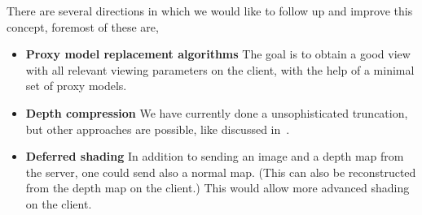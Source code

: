 There are several directions in which we would like to follow up and improve
this concept, foremost of these are,
\begin{itemize}

\item \textbf{Proxy model replacement algorithms} The goal is to obtain a good view with
all relevant viewing parameters on the client, with the help of a minimal set of
proxy models.



\item \textbf{Depth compression} We have currently done a unsophisticated
truncation, but other approaches are possible,
like discussed in~\cite{DBLP:journals/tvcg/Lindstrom14}.


\item \textbf{Deferred shading} In addition to sending an image and a depth map
from the server, one could send also a normal map. (This can also be
reconstructed from the depth map on the client.) This would allow more advanced
shading on the client.


\end{itemize}





%






